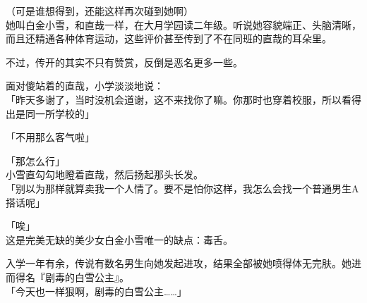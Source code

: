 （可是谁想得到，还能这样再次碰到她啊）\\

她叫白金小雪，和直哉一样，在大月学园读二年级。听说她容貌端正、头脑清晰，而且还精通各种体育运动，这些评价甚至传到了不在同班的直哉的耳朵里。

不过，传开的其实不只有赞赏，反倒是恶名更多一些。

面对傻站着的直哉，小学淡淡地说：\\

「昨天多谢了，当时没机会道谢，这不来找你了嘛。你那时也穿着校服，所以看得出是同一所学校的」

「不用那么客气啦」

「那怎么行」\\

小雪直勾勾地瞪着直哉，然后扬起那头长发。\\

「别以为那样就算卖我一个人情了。要不是怕你这样，我怎么会找一个普通男生A搭话呢」

「唉」\\

这是完美无缺的美少女白金小雪唯一的缺点：毒舌。

入学一年有余，传说有数名男生向她发起进攻，结果全部被她喷得体无完肤。她进而得名『剧毒的白雪公主』。\\

「今天也一样狠啊，剧毒的白雪公主……」

